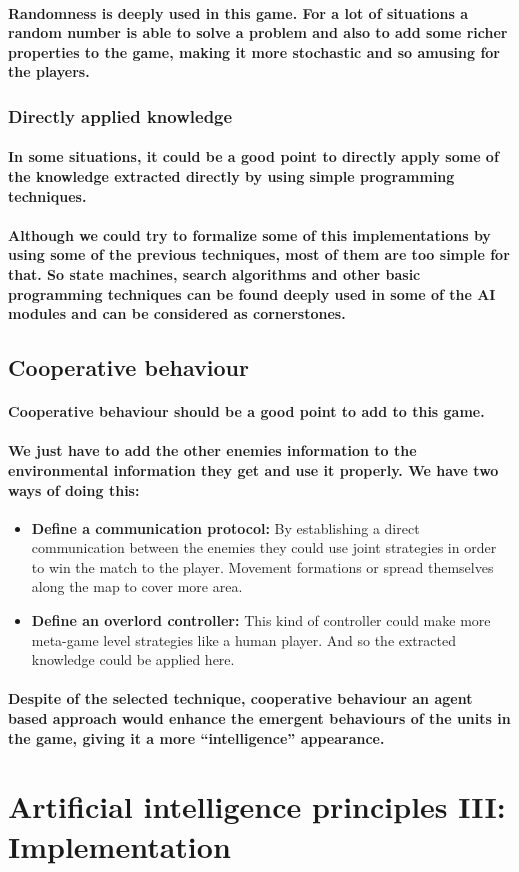 \documentclass[a4paper,10pt]{article}
\newcommand{\p}[1]{\paragraph{\indent\textnormal{#1}}}
\begin{document}
      \p{Randomness is deeply used in this game. For a lot of situations a random number is able to solve a problem and also to add some richer properties to the game, making it more stochastic and so amusing for the players.}

    \subsubsection{Directly applied knowledge}

      \p{In some situations, it could be a good point to directly apply some of the knowledge extracted directly by using simple programming techniques.}

      \p{Although we could try to formalize some of this implementations by using some of the previous techniques, most of them are too simple for that. So state machines, search algorithms and other basic programming techniques can be found deeply used in some of the AI modules and can be considered as cornerstones.}

  \subsection{Cooperative behaviour}

      \p{Cooperative behaviour should be a good point to add to this game.}
      
      \p{We just have to add the other enemies information to the environmental information they get and use it properly. We have two ways of doing this:}

	\begin{itemize}
	 \item \textbf{Define a communication protocol:} By establishing a direct communication between the enemies they could use joint strategies in order to win the match to the player. Movement formations or spread themselves along the map to cover more area.
	 \item \textbf{Define an overlord controller:} This kind of controller could make more meta-game level strategies like a human player. And so the extracted knowledge could be applied here.
	\end{itemize}

      \p{Despite of the selected technique, cooperative behaviour an agent based approach would enhance the emergent behaviours of the units in the game, giving it a more ``intelligence'' appearance.}

\newpage
\section{Artificial intelligence principles III: Implementation}
\end{document}
